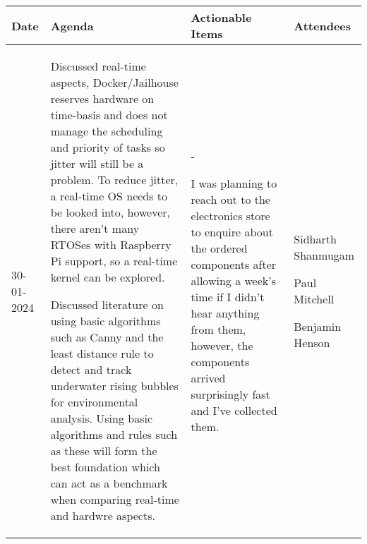 \begin{table}[!h]
    \centering
    \begin{tabularx}{\textwidth}{|l|X|X|X|}
        \hline
        Date & Agenda & Actionable Items & Attendees \\
        \hline
        \hline
        30-01-2024 & 
        \begin{myitemize}
            \item Discussed real-time aspects, Docker/Jailhouse reserves hardware on time-basis and does not manage the scheduling and priority of tasks so jitter will still be a problem. To reduce jitter, a real-time OS needs to be looked into, however, there aren't many RTOSes with Raspberry Pi support, so a real-time kernel can be explored.
            \item Discussed literature on using basic algorithms such as Canny and the least distance rule to detect and track underwater rising bubbles for environmental analysis. Using basic algorithms and rules such as these will form the best foundation which can act as a benchmark when comparing real-time and hardwre aspects.
        \end{myitemize} &
        \begin{myitemize}
            \item -
            \item I was planning to reach out to the electronics store to enquire about the ordered components after allowing a week's time if I didn't hear anything from them, however, the components arrived surprisingly fast and I've collected them.
        \end{myitemize} &
        \begin{myitemize}
            \item Sidharth Shanmugam
            \item Paul Mitchell
            \item Benjamin Henson
        \end{myitemize} \\
        \hline
    \end{tabularx}
\end{table}

\pagebreak

